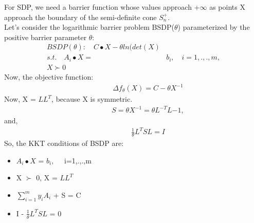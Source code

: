 \documentclass[fleqn]{article}
\begin{document}
For SDP, we need a barrier function whose values approach +$\infty$ as points X approach the boundary of the semi-definite cone $S_n^+$. 
\\
Let's consider the logarithmic barrier problem BSDP($\theta$) parameterized by the positive barrier parameter $\theta$:
\begin{align*}
BSDP(\theta):\quad C \bullet X - \theta ln(det(X)
\\ 
s.t.\quad A_i\bullet X =& b_i,\quad i=1,.,.,m,
\\
X \succ 0
\end{align*}
Now, the objective function:
\begin{align*}
\qquad \qquad \Delta f_{\theta}(X) = C - \theta X^{-1} 
\end{align*}
Now, X = $LL^{T}$, because X is symmetric.\\
\begin{align*}
\qquad \qquad S = \theta X^{-1} = \theta L^{-T} L{-1},
\end{align*}
and,
\begin{align*}
\qquad \qquad \frac{1}{\theta} L^{T}SL = I
\end{align*}
So, the KKT conditions of BSDP are:
\begin{itemize}
    \item $A_i\bullet X$ = $b_i,\quad$ i=1,.,.,m
    \item X $\succ$ 0, X = $LL^{T}$
    \item $\sum_{i=1}^m y_iA_i$ + S = C
    \item I - $\frac{1}{\theta} L^{T}SL$ = 0
\end{itemize}
\end{document}
